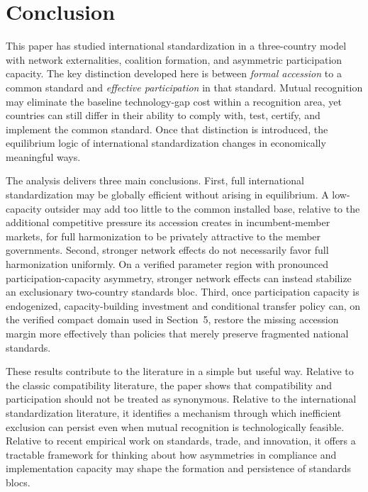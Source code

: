 \section{Conclusion}

This paper has studied international standardization in a three-country model with network externalities, coalition formation, and asymmetric participation capacity. The key distinction developed here is between \emph{formal accession} to a common standard and \emph{effective participation} in that standard. Mutual recognition may eliminate the baseline technology-gap cost within a recognition area, yet countries can still differ in their ability to comply with, test, certify, and implement the common standard. Once that distinction is introduced, the equilibrium logic of international standardization changes in economically meaningful ways.

The analysis delivers three main conclusions. First, full international standardization may be globally efficient without arising in equilibrium. A low-capacity outsider may add too little to the common installed base, relative to the additional competitive pressure its accession creates in incumbent-member markets, for full harmonization to be privately attractive to the member governments. Second, stronger network effects do not necessarily favor full harmonization uniformly. On a verified parameter region with pronounced participation-capacity asymmetry, stronger network effects can instead stabilize an exclusionary two-country standards bloc. Third, once participation capacity is endogenized, capacity-building investment and conditional transfer policy can, on the verified compact domain used in Section~5, restore the missing accession margin more effectively than policies that merely preserve fragmented national standards.

These results contribute to the literature in a simple but useful way. Relative to the classic compatibility literature, the paper shows that compatibility and participation should not be treated as synonymous. Relative to the international standardization literature, it identifies a mechanism through which inefficient exclusion can persist even when mutual recognition is technologically feasible. Relative to recent empirical work on standards, trade, and innovation, it offers a tractable framework for thinking about how asymmetries in compliance and implementation capacity may shape the formation and persistence of standards blocs.

